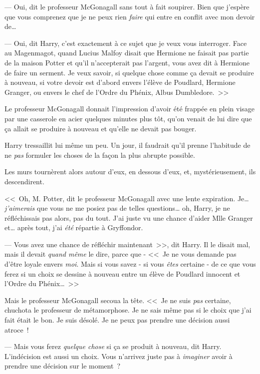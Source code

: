 --- Oui, dit le professeur McGonagall sans tout à fait soupirer. Bien que j'espère que vous comprenez que je ne peux rien \emph{faire} qui entre en conflit avec mon devoir de…

--- Oui, dit Harry, c'est exactement à ce sujet que je veux vous interroger. Face au Magenmagot, quand Lucius Malfoy disait que Hermione ne faisait pas partie de la maison Potter et qu'il n'accepterait pas l'argent, vous avez dit à Hermione de faire un serment. Je veux savoir, si quelque chose comme ça devait se produire à nouveau, si votre devoir est d'abord envers l'élève de Poudlard, Hermione Granger, ou envers le chef de l'Ordre du Phénix, Albus Dumbledore.~>>

Le professeur McGonagall donnait l'impression d'avoir été frappée en plein visage par une casserole en acier quelques minutes plus tôt, qu'on venait de lui dire que ça allait se produire à nouveau et qu'elle ne devait pas bouger.

Harry tressaillit lui même un peu. Un jour, il faudrait qu'il prenne l'habitude de ne \emph{pas} formuler les choses de la façon la plus abrupte possible.

Les murs tournèrent alors autour d'eux, en dessous d'eux, et, mystérieusement, ils descendirent.

<<~Oh, M. Potter, dit le professeur McGonagall avec une lente expiration. Je… \emph{j'aimerais} que vous ne me posiez pas de telles questions… oh, Harry, je ne réfléchissais pas alors, pas du tout. J'ai juste vu une chance d'aider Mlle Granger et… après tout, j'ai \emph{été} répartie à Gryffondor.

--- Vous avez une chance de réfléchir maintenant~>>, dit Harry. Il le disait mal, mais il devait \emph{quand même} le dire, parce que - <<~Je ne vous demande pas d'être loyale envers \emph{moi}. Mais si vous savez - si vous \emph{êtes} certaine - de ce que vous ferez si un choix se dessine à nouveau entre un élève de Poudlard innocent et l'Ordre du Phénix…~>>

Mais le professeur McGonagall secoua la tête. <<~Je ne suis \emph{pas} certaine, chuchota le professeur de métamorphose. Je ne sais même pas si le choix que j'ai fait était le bon. Je suis désolé. Je ne peux pas prendre une décision aussi atroce~!

--- Mais vous ferez \emph{quelque chose} si ça se produit à nouveau, dit Harry. L'indécision est aussi un choix. Vous n'arrivez juste pas à \emph{imaginer} avoir à prendre une décision sur le moment~?


